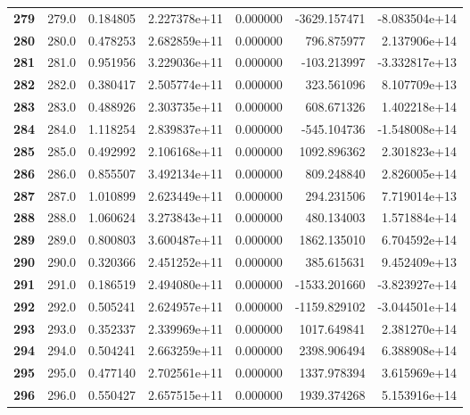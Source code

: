 \documentclass{report}[12pt]
\begin{document}
\begin{center}
\begin{tabular}{lrrrrrr}
\textbf{279 } &          279.0 &   0.184805 &  2.227378e+11 &    0.000000 & -3629.157471 & -8.083504e+14 \\
\textbf{280 } &          280.0 &   0.478253 &  2.682859e+11 &    0.000000 &   796.875977 &  2.137906e+14 \\
\textbf{281 } &          281.0 &   0.951956 &  3.229036e+11 &    0.000000 &  -103.213997 & -3.332817e+13 \\
\textbf{282 } &          282.0 &   0.380417 &  2.505774e+11 &    0.000000 &   323.561096 &  8.107709e+13 \\
\textbf{283 } &          283.0 &   0.488926 &  2.303735e+11 &    0.000000 &   608.671326 &  1.402218e+14 \\
\textbf{284 } &          284.0 &   1.118254 &  2.839837e+11 &    0.000000 &  -545.104736 & -1.548008e+14 \\
\textbf{285 } &          285.0 &   0.492992 &  2.106168e+11 &    0.000000 &  1092.896362 &  2.301823e+14 \\
\textbf{286 } &          286.0 &   0.855507 &  3.492134e+11 &    0.000000 &   809.248840 &  2.826005e+14 \\
\textbf{287 } &          287.0 &   1.010899 &  2.623449e+11 &    0.000000 &   294.231506 &  7.719014e+13 \\
\textbf{288 } &          288.0 &   1.060624 &  3.273843e+11 &    0.000000 &   480.134003 &  1.571884e+14 \\
\textbf{289 } &          289.0 &   0.800803 &  3.600487e+11 &    0.000000 &  1862.135010 &  6.704592e+14 \\
\textbf{290 } &          290.0 &   0.320366 &  2.451252e+11 &    0.000000 &   385.615631 &  9.452409e+13 \\
\textbf{291 } &          291.0 &   0.186519 &  2.494080e+11 &    0.000000 & -1533.201660 & -3.823927e+14 \\
\textbf{292 } &          292.0 &   0.505241 &  2.624957e+11 &    0.000000 & -1159.829102 & -3.044501e+14 \\
\textbf{293 } &          293.0 &   0.352337 &  2.339969e+11 &    0.000000 &  1017.649841 &  2.381270e+14 \\
\textbf{294 } &          294.0 &   0.504241 &  2.663259e+11 &    0.000000 &  2398.906494 &  6.388908e+14 \\
\textbf{295 } &          295.0 &   0.477140 &  2.702561e+11 &    0.000000 &  1337.978394 &  3.615969e+14 \\
\textbf{296 } &          296.0 &   0.550427 &  2.657515e+11 &    0.000000 &  1939.374268 &  5.153916e+14 \\

\end{tabular}
\end{center}
\end{document}
